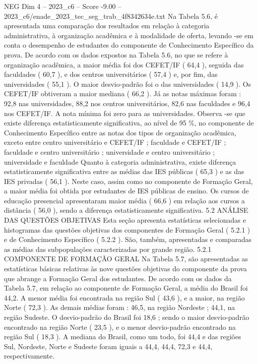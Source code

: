 \begin{textsample}{NEG Dim 4 – 2023\_c6 – Score -9.00 – 2023\_c6/enade\_2023\_tec\_seg\_trab\_4f8342634e.txt}
Na Tabela 5.6, é apresentada uma comparação dos resultados em relação à categoria administrativa, à organização acadêmica e à modalidade de oferta, levando -se em conta o desempenho de estudantes do componente de Conhecimento Específico da prova.
De acordo com os dados expostos na Tabela 5.6, no que se refere à organização acadêmica, a maior média foi dos CEFET/IF ( 64,4 ), seguida das faculdades ( 60,7 ), e dos centros universitários ( 57,4 ) e, por fim, das universidades ( 55,1 ).
O maior desvio-padrão foi o das universidades ( 14,9 ).
Os CEFET/IF obtiveram a maior mediana ( 66,2 ).
Já as notas máximas foram : 92,8 nas universidades, 88,2 nos centros universitários, 82,6 nas faculdades e 96,4 nos CEFET/IF.
A nota mínima foi zero para as universidades.
Observa -se que existe diferença estatisticamente significativa, ao nível de 95 \%, no componente de Conhecimento Específico entre as notas dos tipos de organização acadêmica, exceto entre centro universitário e CEFET/IF ; faculdade e CEFET/IF ; faculdade e centro universitário ; universidade e centro universitário ; universidade e faculdade Quanto à categoria administrativa, existe diferença estatisticamente significativa entre as médias das IES públicas ( 65,3 ) e as das IES privadas ( 56,1 ).
Neste caso, assim como no componente de Formação Geral, a maior média foi obtida por estudantes de IES públicas de ensino.
Os cursos de educação presencial apresentaram maior média ( 66,6 ) em relação aos cursos a distância ( 56,0 ), sendo a diferença estatisticamente significativa. 5.2 ANÁLISE DAS QUESTÕES OBJETIVAS Esta seção apresenta estatísticas selecionadas e histogramas das questões objetivas dos componentes de Formação Geral ( 5.2.1 ) e de Conhecimento Específico ( 5.2.2 ).
São, também, apresentadas e comparadas as médias das subpopulações caracterizadas por grande região. 5.2.1 COMPONENTE DE FORMAÇÃO GERAL Na Tabela 5.7, são apresentadas as estatísticas básicas relativas às nove questões objetivas do componente da prova que abrange a Formação Geral dos estudantes.
De acordo com os dados da Tabela 5.7, em relação ao componente de Formação Geral, a média do Brasil foi 44,2.
A menor média foi encontrada na região Sul ( 43,6 ), e a maior, na região Norte ( 72,3 ).
As demais médias foram : 46,5, na região Nordeste ; 44,1, na região Sudeste.
O desvio-padrão do Brasil foi 18,6 ; sendo o maior desvio-padrão encontrado na região Norte ( 23,5 ), e o menor desvio-padrão encontrado na região Sul ( 18,3 ).
A mediana do Brasil, como um todo, foi 44,4 e das regiões Sul, Nordeste, Norte e Sudeste foram iguais a 44,4, 44,4, 72,3 e 44,4, respectivamente.

\end{textsample}
